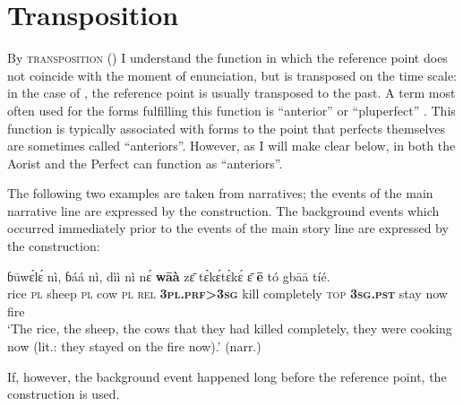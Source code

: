 \documentclass[output=paper,newtxmath,modfonts,nonflat,hidelinks]{langsci/langscibook}
\begin{document}
\section{Transposition}
\label{khachs5}
By \textsc{transposition} (\citealt[217-223]{khachhanks1990}) I understand the function in which the reference point does not coincide with the moment of enunciation, but is transposed on the time scale: in the case of , the reference point is usually transposed to the past. A term most often used for the forms fulfilling this function is ``anterior'' \citep{khachbybee1994} or ``pluperfect'' \citep{khachsich2013}. This function is typically associated with  forms \citep{khachklein1992, khachklein1994} to the point that perfects themselves are sometimes called ``anteriors''. However, as I will make clear below, in  both the Aorist and the Perfect can function as ``anteriors''.

The following two examples are taken from narratives; the events of the main narrative line are expressed by the  construction. The background events which occurred immediately prior to the events of the main story line are expressed by the  construction:

\begin{exe} \ex
\gll	ɓūwɛ́lɛ́	nì,	ɓáá	nì,	dìì	nì	nɛ́	\textbf{wāà}	zɛ̄ tɛ̀kɛ́tɛ̀kɛ́	ɛ̄	\textbf{ē}	tó	gbāā	tíé.\\
	rice	\textsc{pl}	sheep	\textsc{pl}	cow	\textsc{pl}	\textsc{rel}	\textbf{3\textsc{pl}.\textsc{prf}>3\textsc{sg}}	kill completely	\textsc{top}	\textbf{3\textsc{sg}.\textsc{pst}}	stay	now	fire	\\	
\glt ‘The rice, the sheep, the cows that they had killed completely, they were cooking now (lit.: they stayed on the fire now).’ (narr.)
\end{exe}


If, however, the background event happened long before the reference point, the  construction is used.
\end{document}
